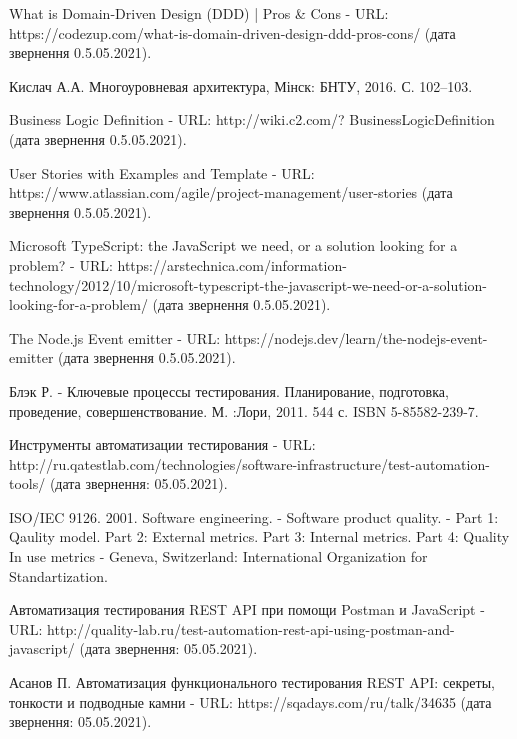 \begin{thebibliography}{00}
			What is Domain-Driven Design (DDD) | Pros \& Cons -
			URL: https://codezup.com/what-is-domain-driven-design-ddd-pros-cons/
			(дата звернення 0.5.05.2021).
	
			Кислач А.А.
			Многоуровневая архитектура,
			Мінск: БНТУ, 2016. С. 102–103.
	
			Business Logic Definition -
			URL: http://wiki.c2.com/?
      BusinessLogicDefinition (дата звернення 0.5.05.2021).
	
			User Stories with Examples and Template -
			URL: https://www.atlassian.com/agile/project-management/user-stories
			(дата звернення 0.5.05.2021).

      Microsoft TypeScript: the JavaScript we need, or a solution looking for a problem? -
      URL: https://arstechnica.com/information-technology/2012/10/microsoft-typescript-the-javascript-we-need-or-a-solution-looking-for-a-problem/
			(дата звернення 0.5.05.2021).

      The Node.js Event emitter -
      URL: https://nodejs.dev/learn/the-nodejs-event-emitter
			(дата звернення 0.5.05.2021).

      Блэк Р. -
      Ключевые процессы тестирования.
      Планирование, подготовка, проведение, совершенствование. М. :Лори,
      2011. 544 с. ISBN 5-85582-239-7.

      Инструменты автоматизации тестирования -
      URL: http://ru.qatestlab.com/technologies/software-infrastructure/test-automation-tools/
      (дата звернення: 05.05.2021).

      ISO/IEC 9126. 2001. Software engineering. -
      Software product quality. -
      Part 1: Qaulity model. 
      Part 2: External metrics. 
      Part 3: Internal metrics. 
      Part 4: Quality In use metrics -
      Geneva, Switzerland: International Organization for Standartization.

      Автоматизация тестирования REST API при помощи Postman и JavaScript -
      URL: http://quality-lab.ru/test-automation-rest-api-using-postman-and-javascript/
      (дата звернення: 05.05.2021).

      Асанов П.
      Автоматизация функционального тестирования REST API:
      секреты, тонкости и подводные камни -
      URL: https://sqadays.com/ru/talk/34635
      (дата звернення: 05.05.2021).

\end{thebibliography}
\endgroup

\clearpage
